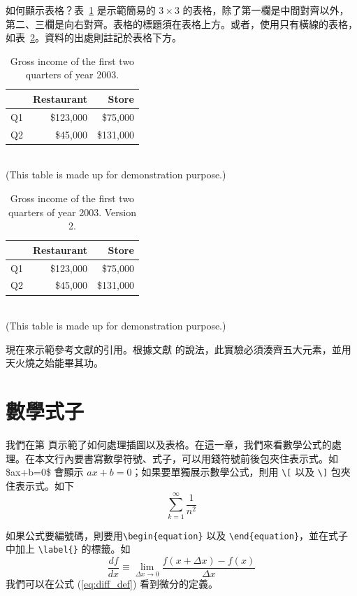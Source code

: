 如何顯示表格？表~\ref{tb:income_2003} 是示範簡易的 $3\times3$ 的表格，除了第一欄是中間對齊以外，第二、三欄是向右對齊。表格的標題須在表格上方。或者，使用只有橫線的表格，如表~\ref{tb:income_2003_v2}。資料的出處則註記於表格下方。
%
\begin{table}[htbp]
\caption{\label{tb:income_2003}Gross income of the first two quarters of
year 2003.}
\centering \begin{tabular}{|c|r|r|}
\hline 
&
Restaurant&
Store\tabularnewline
\hline
\hline 
Q1&
\$123,000&
\$75,000\tabularnewline
\hline 
Q2&
\$45,000&
\$131,000\tabularnewline
\hline
\end{tabular}\\
(This table is made up for demonstration purpose.)
\end{table}%
%
\begin{table}[htbp]
\caption{\label{tb:income_2003_v2}Gross income of the first two quarters of
year 2003. Version 2.}
\centering \begin{tabular}{crr}
\hline 
&
Restaurant&
Store\tabularnewline
\hline
Q1&
\$123,000&
\$75,000\tabularnewline
 Q2&
\$45,000&
\$131,000\tabularnewline
\hline
\end{tabular}\\
(This table is made up for demonstration purpose.)
\end{table}


現在來示範參考文獻的引用。根據文獻\cite{ieee_dmr_2_50_2002_chou} 的說法，此實驗必須湊齊五大元素\cite{jap_093_1108_2003_kondakov, ieee_ed_50_1830_2003_oriols, Chem.Mater._8_1365_1996_Papadimitrakopoulos, jap_079_2745_1996_scott, jap_087_8049_2000_adachi, jap_089_1704_2001_brutting, jap_089_4673_2001_popovic, synth.met._132_9_2002_nomura, cjk_book, thinfilm_macleod_2001}，並用天火燒之始能畢其功。


\chapter{數學式子}
我們在第 \pageref{ch:example} 頁示範了如何處理插圖以及表格。在這一章，我們來看數學公式的處理。在本文行內要書寫數學符號、式子，可以用錢符號前後包夾住表示式。如 \$ax+b=0\$ 會顯示 $ax+b=0$；如果要單獨展示數學公式，則用 \verb+\[+ 以及 \verb+\]+ 包夾住表示式。如下
\[
\sum_{k=1}^{\infty}\frac{1}{n^2}
\]

如果公式要編號碼，則要用\verb+\begin{equation}+ 以及 \verb+\end{equation}+，並在式子中加上 \verb+\label{}+ 的標籤。如
\begin{equation}
  \frac{df}{dx} \equiv \lim_{\Delta x \rightarrow 0} \frac{f(x+\Delta x) - f(x)}{\Delta x}   \label{eq:diff_def}
\end{equation}
我們可以在公式 (\ref{eq:diff_def}) 看到微分的定義。

